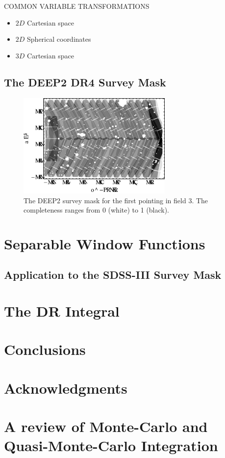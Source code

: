 \documentclass[usenatbib]{mn2e}
\begin{document}
COMMON VARIABLE TRANSFORMATIONS
\begin{itemize}
  \item $2D$ Cartesian space
  \item $2D$ Spherical coordinates
  \item $3D$ Cartesian space
\end{itemize}

\subsection{The DEEP2 DR4 Survey Mask}

\begin{figure}
\includegraphics[width=3in]{plots/deep2mask}
\caption{The DEEP2 survey mask for the first pointing in field 3. The
completeness ranges from 0 (white) to 1 (black). }
\label{fig:deep2mask}
\end{figure}



\section{Separable Window Functions}
\label{sec:sep}

\subsection{Application to the SDSS-III Survey Mask}

\section{The DR Integral}
\label{sec:DR}

\section{Conclusions}
\label{sec:conclude}


\section{Acknowledgments}

\appendix

\section{A review of Monte-Carlo and Quasi-Monte-Carlo Integration}
\label{sec:review}
\end{document}
